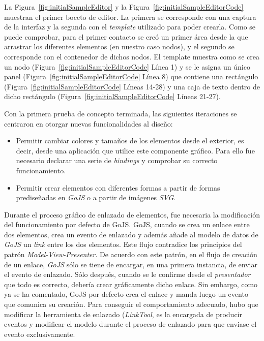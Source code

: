 La Figura~\ref{fig:initialSampleEditor} y la Figura~\ref{fig:initialSampleEditorCode} muestran el primer boceto de editor. La primera se corresponde con una captura de la interfaz y la segunda con el \emph{template} utilizado para poder crearla. Como se puede comprobar, para el primer contacto se creó un primer área desde la que arrastrar los diferentes elementos (en nuestro caso nodos), y el segundo se corresponde con el contenedor de dichos nodos. El template muestra como se crea un nodo (Figura~\ref{fig:initialSampleEditorCode} Línea 1) y se le asigna un único panel (Figura~\ref{fig:initialSampleEditorCode} Línea 8) que contiene una rectángulo (Figura~\ref{fig:initialSampleEditorCode} Líneas 14-28) y una caja de texto dentro de dicho rectángulo (Figura~\ref{fig:initialSampleEditorCode} Líneas 21-27).

Con la primera prueba de concepto terminada, las siguientes iteraciones se centraron en otorgar nuevas funcionalidades al diseño:

\begin{itemize}
	\item Permitir cambiar colores y tamaños de los elementos desde el exterior, es decir, desde una aplicación que utilice este componente gráfico. Para ello fue necesario declarar una serie de \emph{bindings} y comprobar su correcto funcionamiento.
	\item Permitir crear elementos con diferentes formas a partir de formas prediseñadas en \emph{GoJS} o a partir de imágenes \emph{SVG}.
\end{itemize}

Durante el proceso gráfico de enlazado de elementos, fue necesaria la modificación del funcionamiento por defecto de GoJS. GoJS, cuando se crea un enlace entre dos elementos, crea un evento de enlazado y además añade al modelo de datos de \emph{GoJS} un \emph{link} entre los dos elementos. Este flujo contradice los principios del patrón \emph{Model-View-Presenter}. De acuerdo con este patrón, en el flujo de creación de un enlace, \emph{GoJS} sólo se tiene de encargar, en una primera instancia, de enviar el evento de enlazado. Sólo después, cuando se le confirme desde el \emph{presentador} que todo es correcto, debería crear gráficamente dicho enlace. Sin embargo, como ya se ha comentado, GoJS por defecto crea el enlace y manda luego un evento que comunica su creación. Para conseguir el comportamiento adecuado, hubo que modificar la herramienta de enlazado (\emph{LinkTool}, es la encargada de producir eventos y modificar el modelo durante el proceso de enlazado para que enviase el evento exclusivamente.

